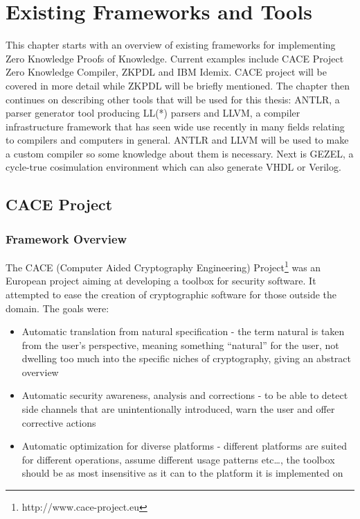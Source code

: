 \chapter{Existing Frameworks and Tools}

This chapter starts with an overview of existing frameworks for
implementing Zero Knowledge Proofs of Knowledge. Current examples
include CACE Project Zero Knowledge Compiler, ZKPDL and IBM
Idemix. CACE project will be covered in more detail while ZKPDL will
be briefly mentioned. The chapter then continues on describing other
tools that will be used for this thesis: ANTLR, a parser generator
tool producing LL(*) parsers and LLVM, a compiler infrastructure
framework that has seen wide use recently in many fields relating to
compilers and computers in general. ANTLR and LLVM will be used to
make a custom compiler so some knowledge about them is necessary. Next
is GEZEL, a cycle-true cosimulation environment which can also
generate VHDL or Verilog.

\section{CACE Project}

\subsection{Framework Overview}

The CACE (Computer Aided Cryptography Engineering)
Project\footnote{http://www.cace-project.eu} was an European project
aiming at developing a toolbox for security software. It attempted to
ease the creation of cryptographic software for those outside the
domain. The goals were:
\begin{itemize}
\item Automatic translation from natural specification - the
  term natural is taken from the user's perspective, meaning something
  ``natural'' for the user, not dwelling too much into the specific
  niches of cryptography, giving an abstract overview
\item Automatic security awareness, analysis and corrections - to be
  able to detect side channels that are unintentionally introduced,
  warn the user and offer corrective actions
\item Automatic optimization for diverse platforms - different
  platforms are suited for different operations, assume different
  usage patterns etc\ldots, the toolbox should be as most insensitive
  as it can to the platform it is implemented on
\end{itemize}


